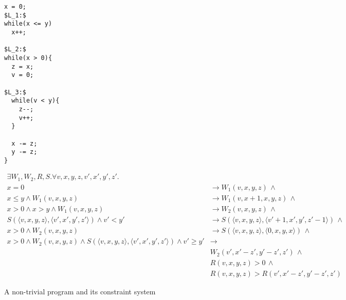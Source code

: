 \documentclass[preprint]{sigplanconf}
\theoremstyle{definition}
\begin{document}
\begin{figure*}
\begin{framed}
\begin{minipage}{0.17\textwidth}
\begin{lstlisting}[mathescape=true]
x = 0;
$L_1:$
while(x <= y)
  x++;

$L_2:$
while(x > 0){
  z = x;
  v = 0;

$L_3:$
  while(v < y){
    z--;
    v++;
  }

  x -= z;
  y -= z;
}
\end{lstlisting}
\end{minipage}
\vline
\begin{minipage}{0.85\textwidth}
\begin{align*}
 \exists W_1, W_2, R, S . \forall v, x, y, z, v', x', y', z' . \\
   x = 0 & \rightarrow W_1(v, x, y, z) \, \wedge \\
   x \leq y \wedge W_1(v, x, y, z) & \rightarrow W_1(v, x+1, x, y, z) \, \wedge \\
   x > 0 \wedge x > y \wedge W_1(v, x, y, z) & \rightarrow W_2(v, x, y, z) \, \wedge \\
   S(\langle v, x, y, z \rangle, \langle v', x', y', z' \rangle) \wedge v' < y' & \rightarrow S(\langle v, x, y, z \rangle, \langle v'+1, x', y', z'-1 \rangle) \, \wedge \\
   x > 0 \wedge W_2(v, x, y, z) & \rightarrow S(\langle v, x, y, z \rangle, \langle 0, x, y, x \rangle) \, \wedge \\
   x > 0 \wedge W_2(v, x, y, z) \wedge S(\langle v, x, y, z \rangle, \langle v', x', y', z' \rangle) \wedge v' \geq y' & \rightarrow \\
   & W_2(v', x' - z', y' - z', z') \, \wedge \\
   & R(v, x, y, z) > 0 \, \wedge \\
   & R(v, x, y, z) > R(v', x' - z', y'-z', z')
\end{align*}
\end{minipage}
\end{framed}
\caption{A non-trivial program and its constraint system\label{fig:environment-model}}
\end{figure*}
\end{document}
